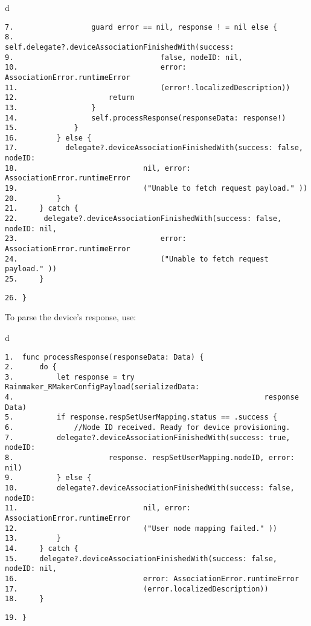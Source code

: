 \documentclass[a4paper,12pt]{book}
\begin{document}
\begin{codebloc}
\begin{tabular}{d}
\vspace{2pt}
\begin{verbatim}
7.                  guard error == nil, response ! = nil else {
8.                      self.delegate?.deviceAssociationFinishedWith(success:
9.                                  false, nodeID: nil,
10.                                 error: AssociationError.runtimeError
11.                                 (error!.localizedDescription))
12.                     return
13.                 }
14.                 self.processResponse(responseData: response!)
15.             }
16.         } else {
17.           delegate?.deviceAssociationFinishedWith(success: false, nodeID:
18.                             nil, error: AssociationError.runtimeError
19.                             ("Unable to fetch request payload." ))
20.         }
21.     } catch {
22.      delegate?.deviceAssociationFinishedWith(success: false, nodeID: nil,
23.                                 error: AssociationError.runtimeError
24.                                 ("Unable to fetch request payload." ))
25.     }
\end{verbatim}
\verb|26. }|
\end{tabular}
\end{codebloc}

To parse the device’s response, use:

\begin{codebloc}
\begin{tabular}{d}
\vspace{2pt}
\begin{verbatim}
1.  func processResponse(responseData: Data) {
2.      do {
3.          let response = try Rainmaker_RMakerConfigPayload(serializedData:
4.                                                          response Data)
5.          if response.respSetUserMapping.status == .success {
6.              //Node ID received. Ready for device provisioning.
7.          delegate?.deviceAssociationFinishedWith(success: true, nodeID:
8.                      response. respSetUserMapping.nodeID, error: nil)
9.          } else {
10.         delegate?.deviceAssociationFinishedWith(success: false, nodeID:
11.                             nil, error: AssociationError.runtimeError
12.                             ("User node mapping failed." ))
13.         }
14.     } catch {
15.     delegate?.deviceAssociationFinishedWith(success: false, nodeID: nil,
16.                             error: AssociationError.runtimeError
17.                             (error.localizedDescription))
18.     }
\end{verbatim}
\verb|19. }|
\end{tabular}
\end{codebloc}
\end{document}
